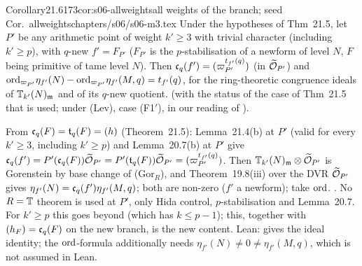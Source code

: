 \begin{quoted}{Corollary}{21.6}{173}{cor:s06-allweights}{all weights of the branch; seed Cor.~allweights}{chapters/s06/s06-m3.tex}\label{rpt:cor:s06-allweights}
Under the hypotheses of Thm~21.5, let $P'$ be any arithmetic point of weight $k'\ge3$ with trivial character
(including $k'\ge p$), with $q$-new $f'=F_{P'}$ ($F_{P'}$ is the $p$-stabilisation of a newform of level $N$, $F$ being primitive of tame level $N$). Then $\mathfrak{c}_q(f')=(\varpi_{P'}^{t_{f'}(q)})$ (in $\widetilde{\mathcal{O}}_{P'}$) and
$\mathrm{ord}_{\varpi_{P'}}\eta_{f'}(N)-\mathrm{ord}_{\varpi_{P'}}\eta_{f'}(M,q)=t_{f'}(q)$, for the ring-theoretic congruence ideals of $\mathbb{T}_{k'}(N)_{\mathfrak{m}}$ and of its
$q$-new quotient. \stpmc{} (with the status of the case of Thm~21.5 that is used; under (Lev), case (F1$'$), in our reading of \cite[Thm~3.14]{KO}).
\end{quoted}
\begin{outline}
From $\mathfrak{c}_q(F)=\mathfrak{t}_q(F)=(h)$ (Theorem~21.5): Lemma~21.4(b) at $P'$ (valid for every $k'\ge3$, including $k'\ge p$) and Lemma~20.7(b) at $P'$
give $\mathfrak{c}_q(f')=P'(\mathfrak{c}_q(F))\widetilde{\mathcal{O}}_{P'}=P'(\mathfrak{t}_q(F))\widetilde{\mathcal{O}}_{P'}=(\varpi_{P'}^{t_{f'}(q)})$. Then $\mathbb{T}_{k'}(N)_{\mathfrak{m}}\otimes\widetilde{\mathcal{O}}_{P'}$ is Gorenstein by
base change of (Gor$_R$), and Theorem~19.8(iii) over the DVR $\widetilde{\mathcal{O}}_{P'}$ gives $\eta_{f'}(N)=\mathfrak{c}_q(f')\eta_{f'}(M,q)$; both are non-zero
($f'$ a newform); take $\mathrm{ord}$. \stpmc. No $R=\mathbb{T}$ theorem is used at $P'$, only Hida control, $p$-stabilisation and Lemma~20.7. For
$k'\ge p$ this goes beyond \cite{KO} (which has $k\le p-1$); this, together with $(h_F)=\mathfrak{c}_q(F)$ on the new branch, is the new content.
Lean:  gives the ideal identity; the $\mathrm{ord}$-formula additionally needs $\eta_{f'}(N)\ne0\ne\eta_{f'}(M,q)$, which
is not assumed in Lean.
\end{outline}


